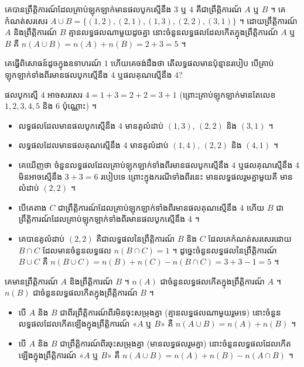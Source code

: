 គេបានព្រឹត្តិការណ៍ដែលគ្រាប់ឡុកឡាក់មានផលបូកស្មើនឹង $3$ ឬ $4$ គឺជាព្រឹត្តិការណ៍ $A$ ឬ $B$ ។ គេកំណត់សរសេរ $A \cup B = \{(1, 2), (2, 1), (1, 3), (2, 2), (3, 1)\}$ ។ ដោយព្រឹត្តិការណ៍ $A$ និងព្រឹត្តិការណ៍ $B$ គ្មានលទ្ធផលណាមួយដូចគ្នា នោះចំនួនលទ្ធផលដែលកើតក្នុងព្រឹត្តិការណ៍ $A$ ឬ $B$ គឺ $n(A \cup B) = n(A) + n(B) = 2 + 3 = 5$ ។

\begin{example}[ឧទាហរណ៍ ២]
គេធ្វើពិសោធន៍ដូចក្នុងឧទាហរណ៍ $1$ ហើយគេចង់ដឹងថា តើលទ្ធផលមានប៉ុន្មានរបៀប បើគ្រាប់ឡុកឡាក់ទាំងពីរមានផលបូកស្មើនឹង $4$ ឬផលគុណស្មើនឹង $4$?
\end{example}
ផលបូកស្មើ $4$ អាចសរសេរ $4 = 1 + 3 = 2 + 2 = 3 + 1$ (ព្រោះគ្រាប់ឡុកឡាក់មានតែលេខ $1, 2, 3, 4, 5$ និង $6$ ប៉ុណ្ណោះ) ។
\begin{itemize}
  \item លទ្ធផលដែលមានផលបូកស្មើនឹង $4$ មានគូលំដាប់ $(1, 3)$, $(2, 2)$ និង $(3, 1)$ ។
  \item លទ្ធផលដែលមានផលគុណស្មើនឹង $4$ មានគូលំដាប់ $(1, 4)$, $(2, 2)$ និង $(4, 1)$ ។
  \item គេឃើញថា ចំនួនលទ្ធផលដែលគ្រាប់ឡុកឡាក់ទាំងពីរមានផលបូកស្មើនឹង $4$ ឬផលគុណស្មើនឹង $4$ មិនអាចស្មើនឹង $3 + 3 = 6$ របៀបទេ ព្រោះក្នុងករណីទាំងពីរនេះ មានលទ្ធផលរួមគ្នាមួយគឺ មានលំដាប់ $(2, 2)$ ។
  \item បើគេតាង $C$ ជាព្រឹត្តិការណ៍ដែលគ្រាប់ឡុកឡាក់ទាំងពីរមានផលគុណស្មើនឹង $4$ ហើយ $B$ ជាព្រឹត្តិការណ៍ដែលគ្រាប់ឡុកឡាក់ទាំងពីរមានផលបូកស្មើនឹង $4$ ។
  \item គេបានគូលំដាប់ $(2, 2)$ គឺជាលទ្ធផលនៃព្រឹត្តិការណ៍ $B$ និង $C$ ដែលគេកំណត់សរសេរដោយ $B \cap C$ ដែលមានចំនួនលទ្ធផល $n(B \cap C) = 1$ ។ ដូច្នេះចំនួនលទ្ធផលនៃព្រឹត្តិការណ៍ $B \cup C$ គឺ $n(B \cup C) = n(B) + n(C) - n(B \cap C) = 3 + 3 - 1 = 5$ ។
\end{itemize}

\begin{formulaBox}[ជាទូទៅ]
គេមានព្រឹត្តិការណ៍ $A$ និងព្រឹត្តិការណ៍ $B$ ។ $n(A)$ ជាចំនួនលទ្ធផលកើតក្នុងព្រឹត្តិការណ៍ $A$ ។ $n(B)$ ជាចំនួនលទ្ធផលកើតក្នុងព្រឹត្តិការណ៍ $B$ ។
\begin{itemize}
  \item បើ $A$ និង $B$ ជាពីរព្រឹត្តិការណ៍ពីរមិនចុះសម្រុងគ្នា (គ្មានលទ្ធផលណាមួយរួមទេ) នោះចំនួនលទ្ធផលដែលកើតឡើងក្នុងព្រឹត្តិការណ៍ «$A$ ឬ $B$» គឺ $n(A \cup B) = n(A) + n(B)$ ។
  \item បើ $A$ និង $B$ ជាព្រឹត្តិការណ៍ពីរចុះសម្រុងគ្នា (មានលទ្ធផលរួមគ្នា) នោះចំនួនលទ្ធផលដែលកើតឡើងក្នុងព្រឹត្តិការណ៍ «$A$ ឬ $B$» គឺ $n(A \cup B) = n(A) + n(B) - n(A \cap B)$ ។
\end{itemize}
\end{formulaBox}

